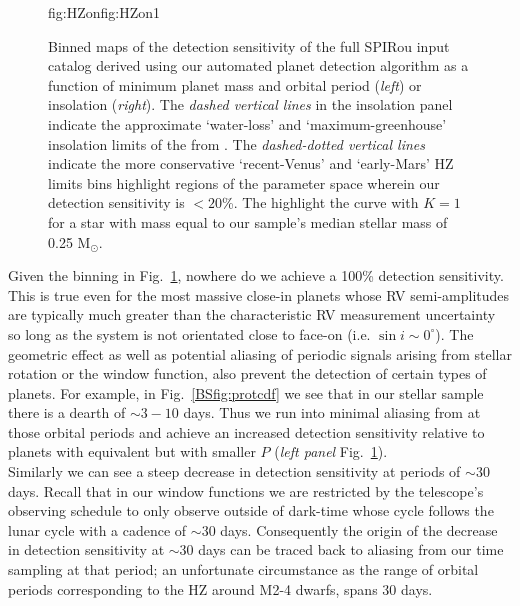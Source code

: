 \begin{figure}
\begin{ocg}{fig:HZon}{fig:HZon}{1}
  \end{ocg}
  \hspace{-\hsize}%
  \caption[Detection sensitivity maps in the SLS-PS.]
      {\small Binned maps of the detection sensitivity of the full SPIRou input catalog derived using our
    automated planet detection algorithm as a function of minimum planet mass and orbital period 
    (\emph{left}) or insolation (\emph{right}). The \emph{dashed vertical lines} in the
    insolation panel indicate the approximate `water-loss' and `maximum-greenhouse' insolation
    limits of the  from \cite{kopparapu13}.
    The \emph{dashed-dotted vertical lines}
    indicate the more conservative `recent-Venus' and `early-Mars' HZ limits \citep{kopparapu13}
     bins highlight
    regions of the parameter space wherein our detection sensitivity is $<20$\%. The
     highlight the curve with $K=1$
    \mps{} for a star with mass equal to our sample's median stellar mass of 0.25 M$_{\odot}$.}
  \label{BSfig:sensitivity}
\end{figure}


Given the binning in Fig.~\ref{BSfig:sensitivity}, nowhere do we achieve a 100\%
detection sensitivity. This is true even for the most massive close-in planets whose RV
semi-amplitudes are typically much greater than the characteristic RV measurement uncertainty so
long as the system is not orientated close to face-on (i.e. $\sin{i} \sim 0^{\circ}$). The geometric effect
as well as potential aliasing of periodic signals arising from stellar rotation or the window
function, also prevent the detection of certain types of planets. For example, in Fig.~\ref{BSfig:protcdf}
we see that in our stellar sample there is a dearth of \prot{} $\sim 3-10$ days. Thus
we run into minimal aliasing from \prot{} at those orbital periods and achieve an increased detection
sensitivity relative to planets with equivalent \msini{} but with smaller $P$
(\emph{left panel} Fig.~\ref{BSfig:sensitivity}). \\

Similarly we can see a steep decrease in detection sensitivity at periods of $\sim 30$ days. Recall that
in our window functions we are restricted by the telescope's observing schedule to only observe outside
of dark-time whose cycle follows the lunar cycle with a cadence of  $\sim 30$ days.
Consequently the origin of the
decrease in detection sensitivity at $\sim 30$ days can be traced back to aliasing from our time
sampling at that period; an unfortunate circumstance as the range of orbital periods corresponding to the
HZ around M2-4 dwarfs, spans 30 days.  \\

